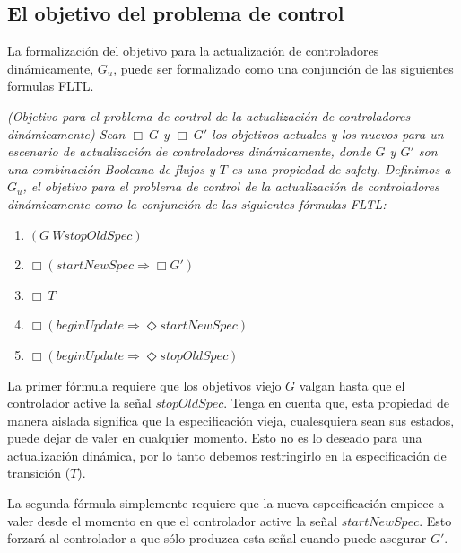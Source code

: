\subsection{El objetivo del problema de control}

La formalización del objetivo para la actualización de controladores dinámicamente, $G_u$, puede ser formalizado
como una conjunción de las siguientes formulas FLTL.

\begin{nahaDef}
\label{update_goals_def}
\emph{(Objetivo para el problema de control de la actualización de controladores dinámicamente) Sean $\Box\ G$ y $\Box\ G'$
los objetivos actuales y los nuevos para un escenario de actualización de controladores dinámicamente, donde $G$ y $G'$
son una combinación Booleana de flujos y $T$ es una propiedad de safety. Definimos a $G_u$, el objetivo para el
problema de control de la actualización de controladores dinámicamente como la conjunción de las siguientes fórmulas
FLTL:}

\begin{enumerate}
\itemsep-4mm
\item $(G\ W stopOldSpec)$
\item $\Box(startNewSpec \Longrightarrow \Box G')$
\item $\Box\ T$
\item $\Box(beginUpdate \Longrightarrow \Diamond startNewSpec)$
\item $\Box(beginUpdate \Longrightarrow \Diamond stopOldSpec)$
\end{enumerate}
\end{nahaDef}

La primer fórmula requiere que los objetivos viejo $G$ valgan hasta que el controlador active la señal $stopOldSpec$.
Tenga en cuenta que, esta propiedad de manera aislada significa que la especificación vieja, cualesquiera sean sus estados,
puede dejar de valer en cualquier momento. Esto no es lo deseado para una actualización dinámica, por lo tanto debemos
restringirlo en la especificación de transición ($T$).

La segunda fórmula simplemente requiere que la nueva especificación empiece a valer desde el momento en que el
controlador active la señal $startNewSpec$. Esto forzará al controlador a que sólo produzca esta señal cuando puede
asegurar $G'$.

